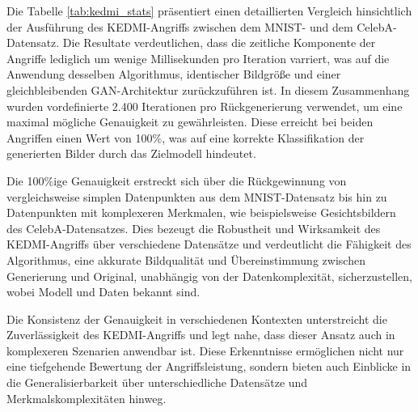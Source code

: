 Die Tabelle \ref{tab:kedmi_stats} präsentiert einen detaillierten Vergleich hinsichtlich der Ausführung des \glqq KEDMI\grqq-Angriffs zwischen dem MNIST- und dem CelebA-Datensatz. Die Resultate verdeutlichen, dass die zeitliche Komponente der Angriffe lediglich um wenige Millisekunden pro Iteration varriert, was auf die Anwendung desselben Algorithmus, identischer Bildgröße und einer gleichbleibenden GAN-Architektur zurückzuführen ist. In diesem Zusammenhang wurden vordefinierte 2.400 Iterationen pro Rückgenerierung verwendet, um eine maximal mögliche Genauigkeit zu gewährleisten. Diese erreicht bei beiden Angriffen einen Wert von 100\%, was auf eine korrekte Klassifikation der generierten Bilder durch das Zielmodell hindeutet. 

Die 100\%ige Genauigkeit erstreckt sich über die Rückgewinnung von vergleichsweise simplen Datenpunkten aus dem MNIST-Datensatz bis hin zu Datenpunkten mit komplexeren Merkmalen, wie beispielsweise Gesichtsbildern des CelebA-Datensatzes. Dies bezeugt die Robustheit und Wirksamkeit des \glqq KEDMI\grqq-Angriffs über verschiedene Datensätze und verdeutlicht die Fähigkeit des Algorithmus, eine akkurate Bildqualität und Übereinstimmung zwischen Generierung und Original, unabhängig von der Datenkomplexität, sicherzustellen, wobei Modell und Daten bekannt sind.

Die Konsistenz der Genauigkeit in verschiedenen Kontexten unterstreicht die Zuverlässigkeit des \glqq KEDMI\grqq-Angriffs und legt nahe, dass dieser Ansatz auch in komplexeren Szenarien anwendbar ist. Diese Erkenntnisse ermöglichen nicht nur eine tiefgehende Bewertung der Angriffsleistung, sondern bieten auch Einblicke in die Generalisierbarkeit über unterschiedliche Datensätze und Merkmalskomplexitäten hinweg.
\begin{table}[h]
	\centering
	\renewcommand{\arraystretch}{1.5}
	\caption{\glqq RBMI\grqq-Angriffsstatistik}
	\label{tab:rbmi_stats}
\end{table}

